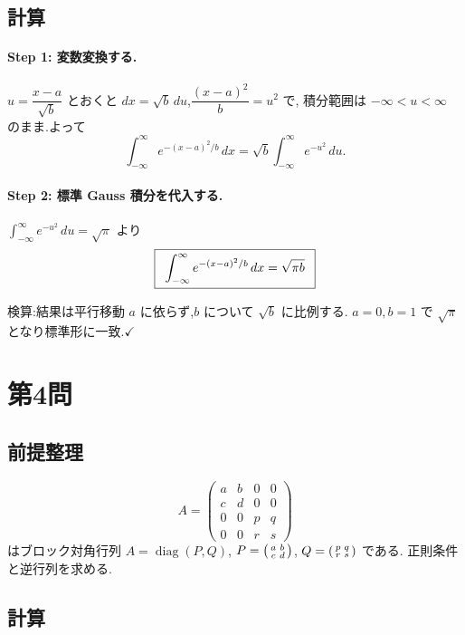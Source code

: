 \documentclass[11pt,a4paper]{article}
\begin{document}
\subsection*{計算}

\paragraph{Step 1: 変数変換する.}
$u=\dfrac{x-a}{\sqrt b}$ とおくと $dx=\sqrt b\,du$,$\dfrac{(x-a)^2}{b}=u^2$ で,
積分範囲は $-\infty<u<\infty$ のまま.よって
\[
\int_{-\infty}^{\infty}e^{-(x-a)^2/b}\,dx=\sqrt b\int_{-\infty}^{\infty}e^{-u^2}\,du.
\]

\paragraph{Step 2: 標準 Gauss 積分を代入する.}
$\displaystyle\int_{-\infty}^{\infty}e^{-u^2}\,du=\sqrt\pi$ より
\[
\ans{\ \int_{-\infty}^{\infty}e^{-(x-a)^2/b}\,dx=\sqrt{\pi b}\ }
\]

検算:結果は平行移動 $a$ に依らず,$b$ について $\sqrt b$ に比例する.
$a=0,b=1$ で $\sqrt\pi$ となり標準形に一致.$\checkmark$

\section*{第4問}

\subsection*{前提整理}

\[
A=\begin{pmatrix}a&b&0&0\\c&d&0&0\\0&0&p&q\\0&0&r&s\end{pmatrix}
\]
はブロック対角行列 $A=\operatorname{diag}(P,Q)$,
$P=\begin{psmallmatrix}a&b\\c&d\end{psmallmatrix}$,
$Q=\begin{psmallmatrix}p&q\\r&s\end{psmallmatrix}$ である.
正則条件と逆行列を求める.

\subsection*{計算}
\end{document}
